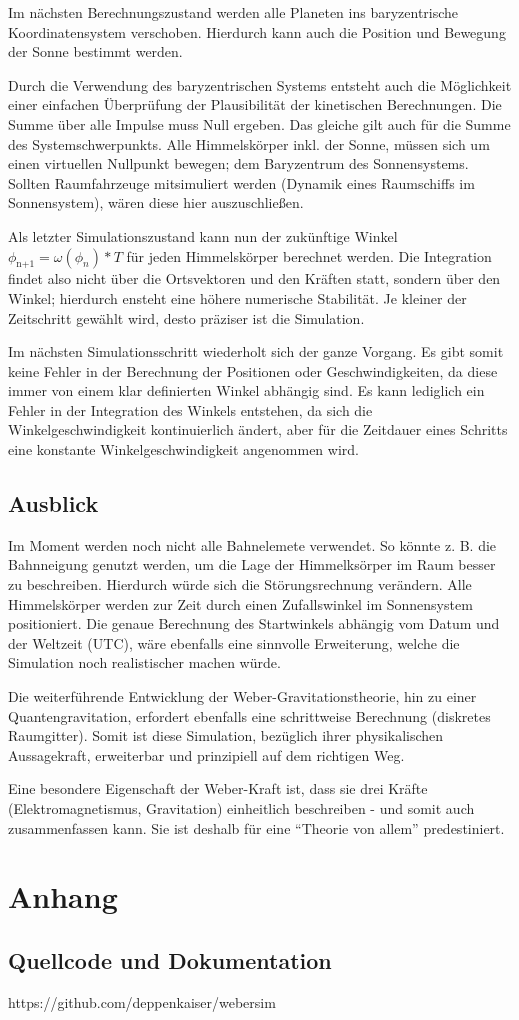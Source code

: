 \documentclass{book}
\begin{document}
Im nächsten Berechnungszustand werden alle Planeten ins baryzentrische Koordinatensystem verschoben. Hierdurch kann auch die
Position und Bewegung der Sonne bestimmt werden.

Durch die Verwendung des baryzentrischen Systems entsteht auch die Möglichkeit einer einfachen Überprüfung der Plausibilität der
kinetischen Berechnungen. Die Summe über alle Impulse muss Null ergeben. Das gleiche gilt auch für die Summe des Systemschwerpunkts.
Alle Himmelskörper inkl. der Sonne, müssen sich um einen virtuellen Nullpunkt bewegen; dem Baryzentrum des Sonnensystems. Sollten
Raumfahrzeuge mitsimuliert werden (Dynamik eines Raumschiffs im Sonnensystem), wären diese hier auszuschließen.

Als letzter Simulationszustand kann nun der zukünftige Winkel $\phi_\text{n+1} = \omega(\phi_n) * T$ für jeden Himmelskörper
berechnet werden. Die Integration findet also nicht über die Ortsvektoren und den Kräften statt, sondern über den Winkel; hierdurch
ensteht eine höhere numerische Stabilität. Je kleiner der Zeitschritt gewählt wird, desto präziser ist die Simulation.

Im nächsten Simulationsschritt wiederholt sich der ganze Vorgang. Es gibt somit keine Fehler in der Berechnung der Positionen
oder Geschwindigkeiten, da diese immer von einem klar definierten Winkel abhängig sind. Es kann lediglich ein Fehler in der
Integration des Winkels entstehen, da sich die Winkelgeschwindigkeit kontinuierlich ändert, aber für die Zeitdauer eines Schritts
eine konstante Winkelgeschwindigkeit angenommen wird.

\section{Ausblick}
Im Moment werden noch nicht alle Bahnelemete verwendet. So könnte z. B. die Bahnneigung genutzt werden, um die Lage der Himmelksörper
im Raum besser zu beschreiben. Hierdurch würde sich die Störungsrechnung verändern. Alle Himmelskörper werden zur Zeit durch einen
Zufallswinkel im Sonnensystem positioniert. Die genaue Berechnung des Startwinkels abhängig vom Datum und der Weltzeit (UTC), wäre ebenfalls
eine sinnvolle Erweiterung, welche die Simulation noch realistischer machen würde.

Die weiterführende Entwicklung der Weber-Gravitationstheorie, hin zu einer Quantengravitation, erfordert ebenfalls eine schrittweise
Berechnung (diskretes Raumgitter). Somit ist diese Simulation, bezüglich ihrer physikalischen Aussagekraft, erweiterbar und prinzipiell
auf dem richtigen Weg.

Eine besondere Eigenschaft der Weber-Kraft ist, dass sie drei Kräfte (Elektromagnetismus, Gravitation) einheitlich beschreiben - und
somit auch zusammenfassen kann. Sie ist deshalb für eine \enquote{Theorie von allem} predestiniert.

\chapter{Anhang}
\section{Quellcode und Dokumentation}
https://github.com/deppenkaiser/webersim
\end{document}
